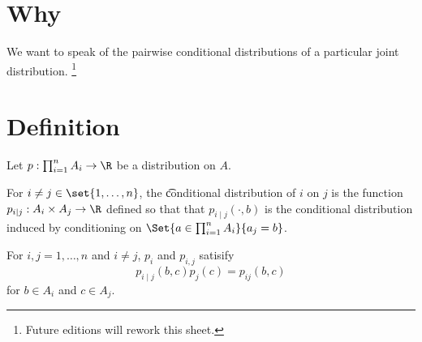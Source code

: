 
\section*{Why}

We want to speak of the pairwise conditional distributions of a particular joint distribution.
  \ifhmode\unskip\fi\footnote{
Future editions will rework this sheet.
  }

\section*{Definition}

Let $p: \prod_{i = 1}^{n} A_i \to \R $ be a distribution on $A$.

For $i \neq j \in \set{1, \dots , n}$, the \t{conditional distribution} of $i$ on $j$ is the function $p_{i \mid  j}: A_i \times  A_j \to \R $ defined so that that $p_{i \mid  j}(\cdot, b)$ is the conditional distribution induced by conditioning on $\Set{a \in \prod_{i = 1}^{n} A_i }{a_j = b}$.

For $i,j = 1, \dots , n$ and $i \neq j$, $p_i$ and $p_{i,j}$ satisify
  \[
p_{i \mid  j}(b, c)p_{j}(c) = p_{ij}(b, c)
  \]
for $b \in A_i$ and $c \in A_j$.

\blankpage